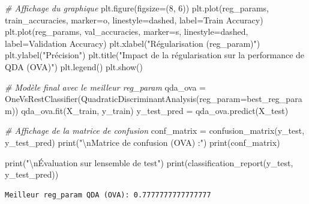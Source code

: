 \documentclass[
  letterpaper,
  DIV=11,
  numbers=noendperiod]{scrartcl}
\newenvironment{Shaded}{}{}
\newcommand{\BuiltInTok}[1]{\textcolor[rgb]{0.00,0.50,0.00}{#1}}
\newcommand{\CharTok}[1]{\textcolor[rgb]{0.25,0.44,0.63}{#1}}
\newcommand{\CommentTok}[1]{\textcolor[rgb]{0.38,0.63,0.69}{\textit{#1}}}
\newcommand{\DecValTok}[1]{\textcolor[rgb]{0.25,0.63,0.44}{#1}}
\newcommand{\NormalTok}[1]{#1}
\newcommand{\OperatorTok}[1]{\textcolor[rgb]{0.40,0.40,0.40}{#1}}
\newcommand{\StringTok}[1]{\textcolor[rgb]{0.25,0.44,0.63}{#1}}
\begin{document}
\begin{Shaded}
\begin{Highlighting}[]
\CommentTok{\# Affichage du graphique}
\NormalTok{plt.figure(figsize}\OperatorTok{=}\NormalTok{(}\DecValTok{8}\NormalTok{, }\DecValTok{6}\NormalTok{))}
\NormalTok{plt.plot(reg\_params, train\_accuracies, marker}\OperatorTok{=}\StringTok{\textquotesingle{}o\textquotesingle{}}\NormalTok{, linestyle}\OperatorTok{=}\StringTok{\textquotesingle{}dashed\textquotesingle{}}\NormalTok{, label}\OperatorTok{=}\StringTok{\textquotesingle{}Train Accuracy\textquotesingle{}}\NormalTok{)}
\NormalTok{plt.plot(reg\_params, val\_accuracies, marker}\OperatorTok{=}\StringTok{\textquotesingle{}s\textquotesingle{}}\NormalTok{, linestyle}\OperatorTok{=}\StringTok{\textquotesingle{}dashed\textquotesingle{}}\NormalTok{, label}\OperatorTok{=}\StringTok{\textquotesingle{}Validation Accuracy\textquotesingle{}}\NormalTok{)}
\NormalTok{plt.xlabel(}\StringTok{"Régularisation (reg\_param)"}\NormalTok{)}
\NormalTok{plt.ylabel(}\StringTok{"Précision"}\NormalTok{)}
\NormalTok{plt.title(}\StringTok{"Impact de la régularisation sur la performance de QDA (OVA)"}\NormalTok{)}
\NormalTok{plt.legend()}
\NormalTok{plt.show()}

\CommentTok{\# Modèle final avec le meilleur reg\_param}
\NormalTok{qda\_ova }\OperatorTok{=}\NormalTok{ OneVsRestClassifier(QuadraticDiscriminantAnalysis(reg\_param}\OperatorTok{=}\NormalTok{best\_reg\_param))}
\NormalTok{qda\_ova.fit(X\_train, y\_train)}
\NormalTok{y\_test\_pred }\OperatorTok{=}\NormalTok{ qda\_ova.predict(X\_test)}

\CommentTok{\# Affichage de la matrice de confusion}
\NormalTok{conf\_matrix }\OperatorTok{=}\NormalTok{ confusion\_matrix(y\_test, y\_test\_pred)}
\BuiltInTok{print}\NormalTok{(}\StringTok{"}\CharTok{\textbackslash{}n}\StringTok{Matrice de confusion (OVA) :"}\NormalTok{)}
\BuiltInTok{print}\NormalTok{(conf\_matrix)}

\BuiltInTok{print}\NormalTok{(}\StringTok{"}\CharTok{\textbackslash{}n}\StringTok{Évaluation sur l\textquotesingle{}ensemble de test"}\NormalTok{)}
\BuiltInTok{print}\NormalTok{(classification\_report(y\_test, y\_test\_pred))}
\end{Highlighting}
\end{Shaded}

\begin{verbatim}
Meilleur reg_param QDA (OVA): 0.7777777777777777
\end{verbatim}
\end{document}
